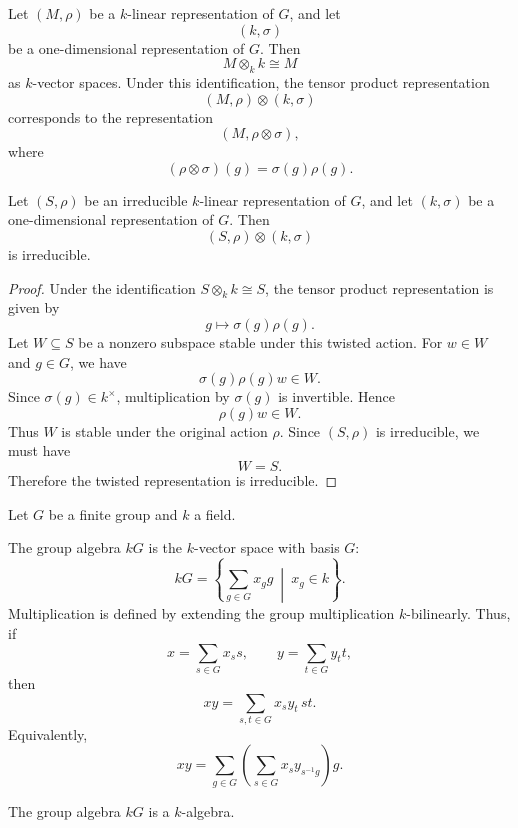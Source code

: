 Let \((M,\rho)\) be a \(k\)-linear representation of \(G\), and let
\[
    (k,\sigma)
\]
be a one-dimensional representation of \(G\). Then
\[
    M\otimes_k k\cong M
\]
as \(k\)-vector spaces. Under this identification, the tensor product representation
\[
    (M,\rho)\otimes(k,\sigma)
\]
corresponds to the representation
\[
    (M,\rho\otimes\sigma),
\]
where
\[
    (\rho\otimes\sigma)(g)=\sigma(g)\rho(g).
\]

\begin{lemma}
    Let \((S,\rho)\) be an irreducible \(k\)-linear representation of \(G\), and
    let \((k,\sigma)\) be a one-dimensional representation of \(G\). Then
    \[
        (S,\rho)\otimes(k,\sigma)
    \]
    is irreducible.
\end{lemma}

\begin{proof}
    Under the identification \(S\otimes_k k\cong S\), the tensor product
    representation is given by
    \[
        g\longmapsto \sigma(g)\rho(g).
    \]
    Let \(W\subseteq S\) be a nonzero subspace stable under this twisted action.
    For \(w\in W\) and \(g\in G\), we have
    \[
        \sigma(g)\rho(g)w\in W.
    \]
    Since \(\sigma(g)\in k^\times\), multiplication by \(\sigma(g)\) is invertible.
    Hence
    \[
        \rho(g)w\in W.
    \]
    Thus \(W\) is stable under the original action \(\rho\). Since \((S,\rho)\) is
    irreducible, we must have
    \[
        W=S.
    \]
    Therefore the twisted representation is irreducible.
\end{proof}

Let \(G\) be a finite group and \(k\) a field.

\begin{definition}
    The group algebra \(kG\) is the \(k\)-vector space with basis \(G\):
    \[
        kG
        =
        \left\{
            \sum_{g\in G} x_g g
            \ \middle|\ 
            x_g\in k
        \right\}.
    \]
    Multiplication is defined by extending the group multiplication \(k\)-bilinearly.
    Thus, if
    \[
        x=\sum_{s\in G}x_s s,
        \qquad
        y=\sum_{t\in G}y_t t,
    \]
    then
    \[
        xy
        =
        \sum_{s,t\in G}x_s y_t\, st.
    \]
    Equivalently,
    \[
        xy
        =
        \sum_{g\in G}
        \left(
            \sum_{s\in G}x_s y_{s^{-1}g}
        \right)g.
    \]
\end{definition}

\begin{proposition}
    The group algebra \(kG\) is a \(k\)-algebra.
\end{proposition}

